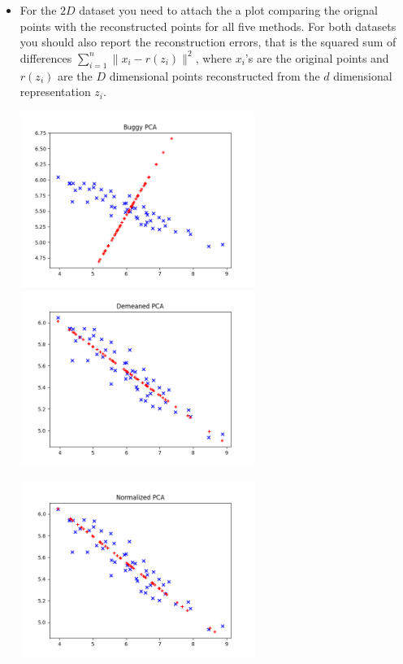 \begin{itemize}
\item
For the $2D$ dataset you need to attach the a 
plot comparing the orignal points with the reconstructed points for all five
methods.
For both datasets you should also report the reconstruction errors, that is the squared sum of
differences $\sum_{i=1}^n \|x_i - r(z_i)\|^2$,
where $x_i$'s are the original points and $r(z_i)$ are the $D$ dimensional points
reconstructed from the 
$d$ dimensional representation $z_i$.

\begin{soln}

  \includegraphics[width=3in]{../figs/buggy_pca.png} \hspace{0.1in}
  \includegraphics[width=3in]{../figs/demeaned_pca.png} \\
  \begin{center}
    \includegraphics[width=3in]{../figs/normalized_pca.png}
  \end{center}


\end{soln}
\end{itemize}
